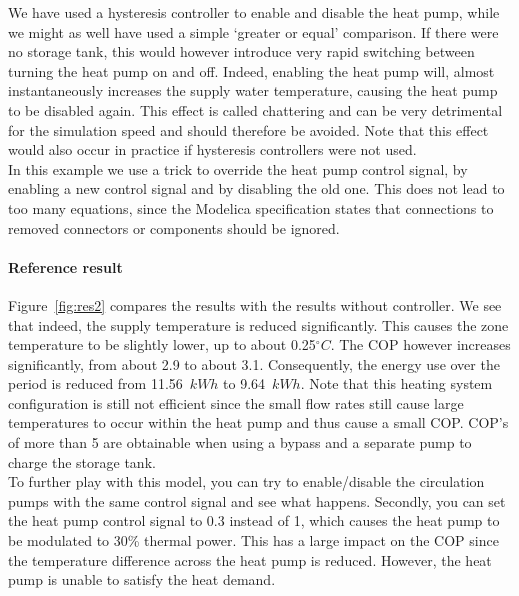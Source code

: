 \documentclass[10pt,a4paper]{article}
\begin{document}
We have used a hysteresis controller to enable and disable the heat pump,
while we might as well have used a simple `greater or equal' comparison.
If there were no storage tank,
this would however introduce very rapid switching between turning the heat pump on
and off. Indeed, enabling the heat pump will, almost instantaneously increases the 
supply water temperature, causing the heat pump to be disabled again.
This effect is called chattering and can be very detrimental for the simulation speed 
and should therefore be avoided.
Note that this effect would also occur in practice if hysteresis controllers were not used.\\

In this example we use a trick to override the heat pump control signal, by enabling a new
control signal and by disabling the old one. This does not lead
to too many equations, since the Modelica specification states that 
connections to removed connectors or components should be ignored.


\paragraph{Reference result}
Figure~\ref{fig:res2} compares the results with the results without controller.
We see that indeed, the supply temperature is reduced significantly.
This causes the zone temperature to be slightly lower, up to about 0.25$^{\circ}C$.
The COP however increases significantly, from about 2.9 to about 3.1.
Consequently, the energy use over the period is reduced from 11.56~$kWh$
to 9.64~$kWh$. Note that this heating system configuration is still 
not efficient since the small flow rates still cause 
large temperatures to occur within the heat pump
and thus cause a small COP.
COP's of more than 5 are obtainable when using a bypass and a separate
pump to charge the storage tank.\\


To further play with this model, you can try to enable/disable the circulation pumps with the same control
signal and see what happens.
Secondly, you can set the heat pump control signal to 0.3 instead of 1,
which causes the heat pump to be modulated to 30\% thermal power.
This has a large impact on the COP since the temperature difference across the heat 
pump is reduced. 
However, the heat pump is unable to satisfy the heat demand.\\
\end{document}
